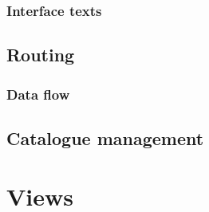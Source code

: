\subsubsection{Interface texts}

\subsection{Routing}
\subsubsection{Data flow}

\subsection{Catalogue management}

\section{Views}
